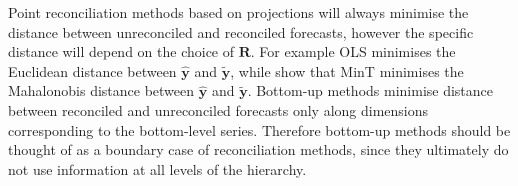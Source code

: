 \documentclass[a4paper, 11pt]{article}
\theoremstyle{definition}
\begin{document}
Point reconciliation methods based on projections will always minimise the distance between unreconciled and reconciled forecasts, however the specific distance will depend on the choice of $\bm{R}$. For example OLS minimises the Euclidean distance between $\hat{\bm{y}}$ and $\tilde{\bm{y}}$, while \citet{Wickramasuriya2017} show that MinT minimises the Mahalonobis distance between $\hat{\bm{y}}$ and $\tilde{\bm{y}}$. Bottom-up methods minimise distance between reconciled and unreconciled forecasts only along dimensions corresponding to the bottom-level series. Therefore bottom-up methods should be thought of as a boundary case of reconciliation methods, since they ultimately do not use information at all levels of the hierarchy.


%

\end{document}
